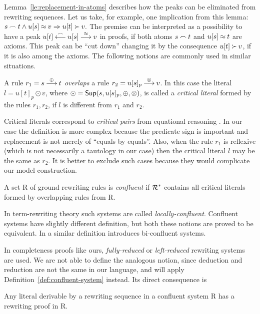Lemma~\ref{le:replacement-in-atoms} describes how the peaks can be eliminated
from rewriting sequences. Let us take, for example, one implication from this lemma:
\(s\mathbin{\frown} t\land u[s]\mathbin{\approx} v\mathrel\Rightarrow u[t]\mathbin{\succ} v.\)
The premise can be interpreted as a possibility to have a peak \(u[t] \mathbin{\stackrel{\mathbin{\frown}}{\longleftarrow}}
u[s] \mathbin{\stackrel{\mathbin{\approx}}{\longrightarrow}} v \) in proofs, if both atoms \(s\mathbin{\frown} t\) and \(u[s]\mathbin{\approx} t\) are
axioms. This peak can be ``cut down'' changing it by the consequence
\(u[t]\mathbin{\succ} v\), if it is also among the axioms. The following notions are
commonly used in similar situations. 
%
\begin{DEFINITION} \label {def:critical-atom}
A rule \(r_1 = s\mathbin{\stackrel{\oplus}{\longrightarrow}} t\) {\em overlaps} a rule \(r_2 = u[s]_p \mathbin{\stackrel{\otimes}{\longrightarrow}} 
v\). In this case the literal \(l = u[t]_p \odot v\), where \(\odot = 
\mbox{\sf Sup}(s,u[s]_p,\oplus,\otimes)\), is called a {\em critical literal} formed by 
the rules \(r_1,r_2\), if $l$ is different from \(r_1\) and \(r_2\).
\end{DEFINITION}
Critical literals correspond to {\em critical pairs} from equational reasoning 
\cite{Der}. In our case the definition is more complex because the predicate 
sign is important and replacement is not merely of ``equals by equals''. Also, 
when the rule \(r_1\) is
reflexive (which is not necessarily a tautology in our case) then
the critical literal $l$ may be the same as \(r_2\). It is better to exclude
such cases because they would complicate our model construction.
\begin{DEFINITION} \label{def:confluent-system}
A set \C R of ground rewriting rules is {\em confluent} if $\mbox{$\cal R$}^\ast$ contains 
all critical literals formed by overlapping rules from \C R.
\end{DEFINITION}
In term-rewriting theory \cite{Der} such systems are called {\em 
locally-confluent}. Confluent systems have slightly different definition, but 
both these notions are proved to be equivalent.  In \cite{LA} a similar 
definition introduces bi-confluent systems.

In completeness proofs like ours, {\em fully-reduced} \cite{PP} or {\em
left-reduced} \cite{S-A,BG} rewriting systems are used.  We are not able to
define the analogous notion, since deduction and reduction 
are not the same in our language, and will apply
Definition~\ref{def:confluent-system} instead. Its direct consequence is
\begin{LEMMA} \label{le:proofs-in-confluent}
Any literal derivable by a rewriting sequence in a confluent system \C R has
a rewriting proof in \C R.
\end{LEMMA}
%

